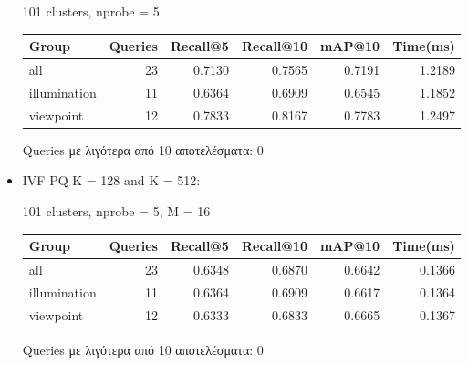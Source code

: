\documentclass [conference]{IEEEtran}
\begin{document}
\begin{itemize}
     \begin{table}[H]
    \centering
    \small
    \setlength{\tabcolsep}{3pt}
    101 clusters, nprobe = 5
    \par\smallskip
    \begin{tabular}{l r r r r r}
    \hline
    \textbf{Group} & \textbf{Queries} & \textbf{Recall@5} & \textbf{Recall@10} & \textbf{mAP@10} & \textbf{Time(ms)} \\
    \hline
    all & 23 & 0.7130 & 0.7565 & 0.7191 & 1.2189 \\
    illumination & 11 & 0.6364 & 0.6909 & 0.6545 & 1.1852 \\
    viewpoint & 12 & 0.7833 & 0.8167 & 0.7783 & 1.2497 \\
    \hline
    \end{tabular}
    \par\smallskip
    \footnotesize Queries με λιγότερα από 10 αποτελέσματα: 0
    \end{table}
     
     

    \item IVF PQ K = 128 and K = 512:
    \begin{table}[H]
    \centering
    \small
    \setlength{\tabcolsep}{3pt}
    101 clusters, nprobe = 5, Μ = 16
    \par\smallskip
    \begin{tabular}{l r r r r r}
    \hline
    \textbf{Group} & \textbf{Queries} & \textbf{Recall@5} & \textbf{Recall@10} & \textbf{mAP@10} & \textbf{Time(ms)} \\
    \hline
    all & 23 & 0.6348 & 0.6870 & 0.6642 & 0.1366 \\
    illumination & 11 & 0.6364 & 0.6909 & 0.6617 & 0.1364 \\
    viewpoint & 12 & 0.6333 & 0.6833 & 0.6665 & 0.1367 \\
    \hline
    \end{tabular}
    \par\smallskip
    \footnotesize Queries με λιγότερα από 10 αποτελέσματα: 0
    \end{table}
    


\end{itemize}
\end{document}
